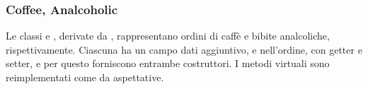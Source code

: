 \subsubsection{Coffee, Analcoholic} %
\label{ssub:coffe_analcoholic}
Le classi  e , derivate da , rappresentano ordini di caffè e bibite analcoliche, rispettivamente. Ciascuna ha un campo dati aggiuntivo,  e  nell'ordine, con getter e setter, e per questo forniscono entrambe costruttori. I metodi virtuali sono reimplementati come da aspettative.

